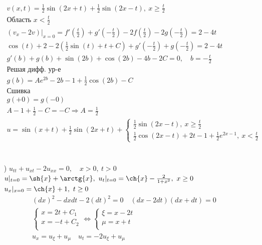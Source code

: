 \begin{enumerate}
\begin{gather*}
      v(x,t)=\frac{1}{2}\sin(2x+t)+\frac{1}{2}\sin(2x-t), \ x \geq \frac{t}{2} \\
      \text{Область $x < \frac{t}{2}$} \\
      \left(v_{x}-2v\right)|_{x=0}=f'\left(\frac{t}{2}\right)+g'\left(-\frac{t}{2}\right)-2f\left(\frac{t}{2}\right)-2g\left(-\frac{t}{2}\right) = 
      2 - 4t\\
\cos\left(t\right)+2-2\left(\frac{1}{2}\sin\left(t\right)+t+C\right)+g'\left(-\frac{t}{2}\right)+g\left(-\frac{t}{2}\right)=2-4t \\
g'(b)+g(b)+\sin(2b)+\cos(2b)-4b-2C = 0, \quad b = - \frac{t}{2} \\
\text{Решая дифф. ур-е} \\
g(b)=Ae^{2b}-2b-1+\frac{1}{2}\cos(2b)-C \\
\text{Сшивка} \\
g(+0)=g(-0) \\
A-1+\frac{1}{2}-C=-C \Rightarrow A =\frac{1}{2} \\
\boxed{u=\sin(x+t)+\frac{1}{2}\sin(2x+t)+\begin{cases}
  \frac{1}{2}\sin(2x-t), \ x \geq \frac{t}{2} \\
\frac{1}{2}\cos(2x-t)+2t-1+\frac{1}{2}e^{2x-1}, \ x < \frac{t}{2}
\end{cases}} \\
\end{gather*} \\
\item[\text{г})] $u_{tt}+u_{xt}-2u_{xx}=0, \quad x >0, \ t>0$ \\
  $u|_{t=0}=\sh{x}+\arctg{x}, \ u_{t}|_{t=0}= \ch{x}- \frac{2}{1+x^{2}}, \ x \geq 0$ \\
  $u_{x}|_{x=0}=\ch{x}+1, \ t \geq 0$ \\
  \begin{gather*}
    (dx)^{2}-dxdt-2(dt)^{2}=0 \quad (dx-2dt)(dx+dt) = 0 \\
    \begin{cases}
     x = 2t + C_{1} \\ x = -t + C_{2} \\
    \end{cases} \Leftrightarrow
    \begin{cases}
     \xi = x-2t \\ \mu = x+t \\ 
    \end{cases} \\
    u_{x} = u_{\xi} + u_{\mu} \quad u_{t} = -2u_{\xi} + u_{\mu} \\

\end{gather*}
\end{enumerate}
